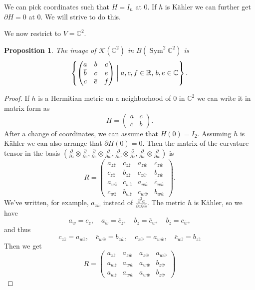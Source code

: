 \documentclass[10pt,a4paper]{amsart}
\newtheorem{prop}[theo]{Proposition}
\theoremstyle{definition}
\def\ov#1{\overline{#1}}
\newcommand{\kk}[1]{\mathbb{#1}}
\newcommand{\cc}[1]{\mathcal{#1}}
\DeclareMathOperator{\Sym}{Sym}
\begin{document}
We can pick coordinates such that $H = I_n$ at $0$.
If $h$ is K\"ahler we can further get $\partial H = 0$ at $0$.
We will strive to do this.

We now restrict to $V = \kk C^2$.

\begin{prop}
The image of $\cc K(\kk C^2)$ in $B(\Sym^2 \kk C^2)$ is
$$
\left\{
\begin{pmatrix}
a & b & c
\\
\ov b & c & e
\\
c & \ov e & f
\end{pmatrix}
\biggm|
\text{$a, c, f \in \kk R$, $b, e \in \kk C$}
\right\}.
$$
\end{prop}


\begin{proof}
If $h$ is a Hermitian metric on a neighborhood of $0$ in $\kk C^2$
we can write it in matrix form as
$$
H = \begin{pmatrix}
a & c
\\
\ov c & b
\end{pmatrix}.
$$
After a change of coordinates, we can assume that $H(0) = I_2$.
Assuming $h$ is K\"ahler we can also arrange that $\partial H(0) = 0$.
Then the matrix of the curvature tensor in the basis
\def\tg#1#2{\frac{\partial}{\partial #1} \otimes \frac{\partial}{\partial #2}}
$(\tg zz, \tg zw, \tg wz, \tg ww)$
is
$$
R = \begin{pmatrix}
a_{z \ov z} & \ov c_{z \ov z} & a_{z \ov w} & \ov c_{z \ov w}
\\
c_{z \ov z} & b_{z \ov z} & c_{z \ov w} & b_{z \ov w}
\\
a_{w \ov z} & \ov c_{w \ov z} & a_{w \ov w} & \ov c_{w \ov w}
\\
c_{w \ov z} & b_{w \ov z} & c_{w \ov w} & b_{w \ov w}
\end{pmatrix}.
$$
We've written, for example, $a_{z \ov w}$ instead of $\frac{\partial^2 a}{\partial z \partial \ov w}$.
The metric $h$ is K\"ahler, so we have
$$
a_w = c_{z},
\quad
a_{\ov w} = \ov c_{\ov z},
\quad
b_z = \ov c_w,
\quad
b_{\ov z} = c_{\ov w},
$$
and thus
$$
c_{z \ov z} = a_{w \ov z},
\quad
\ov c_{w \ov w} = b_{z \ov w},
\quad
c_{z \ov w} = a_{w \ov w},
\quad
\ov c_{w \ov z} = b_{z \ov z}
$$
Then we get
$$
R = \begin{pmatrix}
a_{z \ov z} & a_{z \ov w} & a_{z \ov w} & a_{w \ov w}
\\
a_{w \ov z} & a_{w \ov w} & a_{w \ov w} & b_{z \ov w}
\\
a_{w \ov z} & a_{w \ov w} & a_{w \ov w} & b_{z \ov w}

\end{pmatrix}$$
\end{proof}
\end{document}
